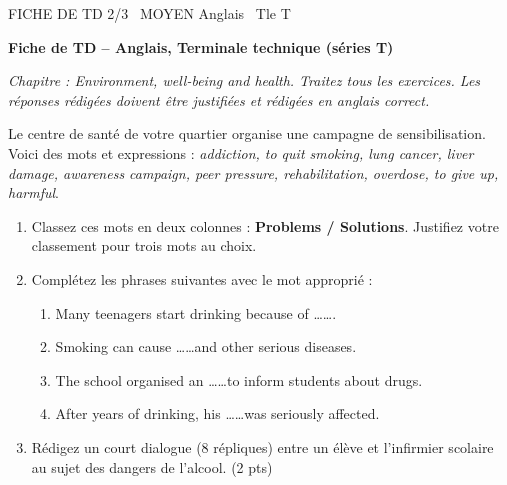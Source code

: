 \documentclass[11pt]{article}
\begin{document}
\begin{tcolorbox}[enhanced,colback=popink,colframe=popink,arc=10pt,boxrule=0pt,left=12pt,right=12pt,top=9pt,bottom=9pt]
{\color{white}\popxbold\small FICHE DE TD 2/3 \textbullet\ MOYEN \hfill Anglais \textbullet\ Tle T\par}
\end{tcolorbox}
\vspace{4pt}
\textbf{Fiche de TD -- Anglais, Terminale technique (séries T)}

\textit{Chapitre : Environment, well-being and health. Traitez tous les exercices. Les réponses rédigées doivent être justifiées et rédigées en anglais correct.}

\begin{exercice}
Le centre de santé de votre quartier organise une campagne de sensibilisation. Voici des mots et expressions : \textit{addiction, to quit smoking, lung cancer, liver damage, awareness campaign, peer pressure, rehabilitation, overdose, to give up, harmful}.
\begin{enumerate}
\item Classez ces mots en deux colonnes : \textbf{Problems / Solutions}. Justifiez votre classement pour trois mots au choix.
\item Complétez les phrases suivantes avec le mot approprié :
\begin{enumerate}
\item Many teenagers start drinking because of \ldots\ldots .
\item Smoking can cause \ldots\ldots and other serious diseases.
\item The school organised an \ldots\ldots to inform students about drugs.
\item After years of drinking, his \ldots\ldots was seriously affected.
\end{enumerate}
\item Rédigez un court dialogue (8 répliques) entre un élève et l'infirmier scolaire au sujet des dangers de l'alcool. (2 pts)
\end{enumerate}
\end{exercice}
\end{document}

